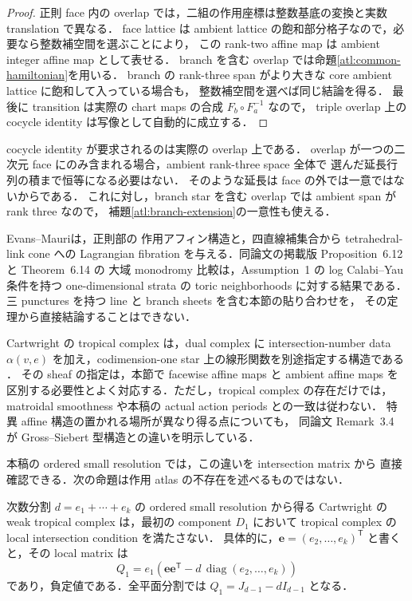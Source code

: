 \begin{proof}
正則 face 内の overlap では，二組の作用座標は整数基底の変換と実数 translation で異なる．
face lattice は ambient lattice の飽和部分格子なので，必要なら整数補空間を選ぶことにより，
この rank-two affine map は ambient integer affine map として表せる．
branch を含む overlap では命題\ref{atl:common-hamiltonian}を用いる．
branch の rank-three span がより大きな core ambient lattice に飽和して入っている場合も，
整数補空間を選べば同じ結論を得る．
最後に transition は実際の chart maps の合成 $F_b\circ F_a^{-1}$ なので，
triple overlap 上の cocycle identity は写像として自動的に成立する．
\end{proof}

cocycle identity が要求されるのは実際の overlap 上である．
overlap が一つの二次元 face にのみ含まれる場合，ambient rank-three space 全体で
選んだ延長行列の積まで恒等になる必要はない．
そのような延長は face の外では一意ではないからである．
これに対し，branch star を含む overlap では ambient span が rank three なので，
補題\ref{atl:branch-extension}の一意性も使える．

Evans--Mauri\cite[Remark~2.7, Lemma~3.1 and \S3.1]{EM}は，正則部の
作用アフィン構造と，四直線補集合から tetrahedral-link cone への
Lagrangian fibration を与える．同論文の掲載版 Proposition~6.12 と Theorem~6.14 の
大域 monodromy 比較は，Assumption~1 の log Calabi--Yau 条件を持つ
one-dimensional strata の toric neighborhoods に対する結果である．
三 punctures を持つ line と branch sheets を含む本節の貼り合わせを，
その定理から直接結論することはできない．

Cartwright の tropical complex は，dual complex に intersection-number data
$\alpha(v,e)$ を加え，codimension-one star 上の線形関数を別途指定する構造である
\cite[Definitions~2.5, 2.8; Construction~3.2]{CartwrightComplexes}．
その sheaf の指定は，本節で facewise affine maps と ambient affine maps を
区別する必要性とよく対応する．ただし，tropical complex の存在だけでは，
matroidal smoothness や本稿の actual action periods との一致は従わない．
特異 affine 構造の置かれる場所が異なり得る点についても，
同論文 Remark~3.4 が Gross--Siebert 型構造との違いを明示している．

本稿の ordered small resolution では，この違いを intersection matrix から
直接確認できる．次の命題は作用 atlas の不存在を述べるものではない．

\begin{proposition}
\label{atl:cartwright-distinction}
次数分割 $d=e_1+\cdots+e_k$ の ordered small resolution から得る
Cartwright の weak tropical complex は，最初の component $D_1$ において
tropical complex の local intersection condition を満たさない．
具体的に，$\mathbf e=(e_2,\ldots,e_k)^{\mathsf T}$ と書くと，その local matrix は
\begin{equation}\label{atl:negative-cartwright}
 Q_1=e_1\left(\mathbf e\mathbf e^{\mathsf T}
                  -d\,\operatorname{diag}(e_2,\ldots,e_k)\right)
\end{equation}
であり，負定値である．全平面分割では $Q_1=J_{d-1}-dI_{d-1}$ となる．
\end{proposition}

